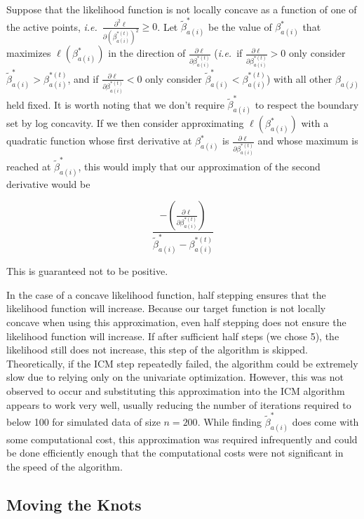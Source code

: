 	Suppose that the likelihood function is not locally concave as a function of one of the active points, \emph{i.e.}\ $ \frac{\partial^2 \ell} { \partial {(\beta^{*(t)}_{a(i)})}^2} \geq 0$. Let $\tilde \beta^*_{a(i)}$ be the value of $\beta^*_{a(i)}$ that maximizes $\ell(\beta^*_{a(i)})$ in the direction of $ \frac{\partial \ell} {\partial \beta^{*(t)}_{a(i)}} $ (\emph{i.e.}\ if $  \frac{\partial \ell} {\partial \beta^{*(t)}_{a(i)}} > 0$ only consider  $\tilde \beta^*_{a(i)} > \beta^{*(t)}_{a(i)}$, and if $  \frac{\partial \ell} {\partial \beta^{*(t)}_{a(i)}}< 0 $ only consider $\tilde \beta^*_{a(i)} < \beta^{*(t)}_{a(i)}$)  with all other $\beta_{a(j)}$ held fixed. It is worth noting that we don't require $\tilde \beta^*_{a(i)}$ to respect the boundary set by log concavity. If we then consider approximating $\ell(\beta^*_{a(i)})$ with a quadratic function whose first derivative at $\beta^*_{a(i)}$ is $  \frac{\partial \ell} {\partial \beta^{*(t)}_{a(i)}} $ and whose maximum is reached at $\tilde \beta^*_{a(i)}$, this would imply that our approximation of the second derivative would be
	
	 \[\frac{- \left( \frac{\partial \ell} {\partial \beta^{*(t)}_{a(i)} }  \right) } {\tilde \beta^*_{a(i)} -\beta^{*(t)}_{a(i)}}
	 \]
	 
	 This is guaranteed not to be positive.
	
	In the case of a concave likelihood function, half stepping ensures that the likelihood function will increase. Because our target function is not locally concave when using this approximation, even half stepping does not ensure the likelihood function will increase. If after sufficient half steps (we chose 5), the likelihood still does not increase, this step of the algorithm is skipped. Theoretically, if the ICM step repeatedly failed, the algorithm could be extremely slow due to relying only on the univariate optimization. However, this was not observed to occur and substituting this approximation into the ICM algorithm appears to work very well, usually reducing the number of iterations required to below 100 for simulated data of size $n = 200$. While finding  $\tilde \beta^*_{a(i)}$ does come with some computational cost, this approximation was required infrequently and could be done efficiently enough that the computational costs were not significant in the speed of the algorithm. 
	\\
	
		{\subsection{Moving the Knots} } 
	
